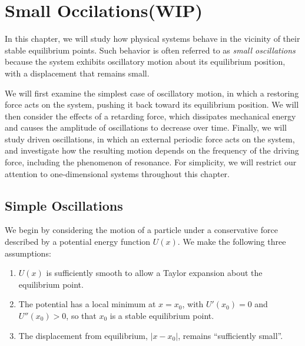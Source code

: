 \documentclass[../main.tex]{subfiles}
\begin{document}
\chapter{Small Occilations(WIP)}

In this chapter, we will study how physical systems behave in the vicinity of their stable equilibrium points. Such behavior is often referred to as \textit{small oscillations} because the system exhibits oscillatory motion about its equilibrium position, with a displacement that remains small.

We will first examine the simplest case of oscillatory motion, in which a restoring force acts on the system, pushing it back toward its equilibrium position. We will then consider the effects of a retarding force, which dissipates mechanical energy and causes the amplitude of oscillations to decrease over time. Finally, we will study driven oscillations, in which an external periodic force acts on the system, and investigate how the resulting motion depends on the frequency of the driving force, including the phenomenon of resonance. For simplicity, we will restrict our attention to one-dimensional systems throughout this chapter.

\section{Simple Oscillations}

We begin by considering the motion of a particle under a conservative force described by a potential energy function $U(x)$. We make the following three assumptions:
\begin{enumerate}
    \item[(i)] $U(x)$ is sufficiently smooth to allow a Taylor expansion about the equilibrium point.
    \item[(ii)] The potential has a local minimum at $x=x_0$, with $U'(x_0)=0$ and $U''(x_0)>0$, so that $x_0$ is a stable equilibrium point.
    \item[(iii)] The displacement from equilibrium, $|x-x_0|$, remains ``sufficiently small''.
\end{enumerate}
\end{document}
